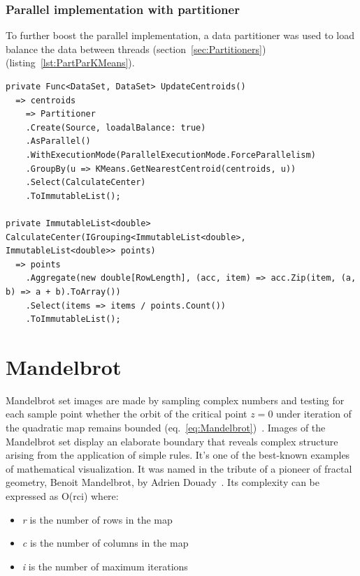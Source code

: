 \subsubsection{Parallel implementation with partitioner}
To further boost the parallel implementation, a data partitioner was used to load balance the data between threads (section~\ref{sec:Partitioners}) (listing~\ref{lst:PartParKMeans}). 

\begin{lstlisting}[style=sharpcstyle, caption={Parallel \texttt{k-means} algorithm with partitioner}, label={lst:PartParKMeans},
numbers=none, xleftmargin=0pt,framexleftmargin=0pt,framexrightmargin=0pt,framexbottommargin=0pt]
private Func<DataSet, DataSet> UpdateCentroids()
  => centroids 
    => Partitioner
    .Create(Source, loadalBalance: true)
    .AsParallel()
    .WithExecutionMode(ParallelExecutionMode.ForceParallelism)
    .GroupBy(u => KMeans.GetNearestCentroid(centroids, u))
    .Select(CalculateCenter)
    .ToImmutableList();

private ImmutableList<double> CalculateCenter(IGrouping<ImmutableList<double>, ImmutableList<double>> points) 
  => points
    .Aggregate(new double[RowLength], (acc, item) => acc.Zip(item, (a, b) => a + b).ToArray())
    .Select(items => items / points.Count())
    .ToImmutableList();
\end{lstlisting}

\clearpage
\section{Mandelbrot}
\label{sec: MandelbrotImp}
Mandelbrot set images are made by sampling complex numbers and testing for each sample point whether the orbit of the critical point $z = 0$ under iteration of the quadratic map remains bounded (eq.~\ref{eq:Mandelbrot})~\cite{MandelbrotExplorer}. Images of the Mandelbrot set display an elaborate boundary that reveals complex structure arising from the application of simple rules. It's one of the best-known examples of mathematical visualization. It was named in the tribute of a pioneer of fractal geometry, Benoit Mandelbrot, by Adrien Douady~\cite{Douady}.
Its complexity can be expressed as O(rci) where:
\begin{itemize}
	\item \emph{r} is the number of rows in the map
	\item \emph{c} is the number of columns in the map
	\item \emph{i} is the number of maximum iterations
	\end{itemize}


